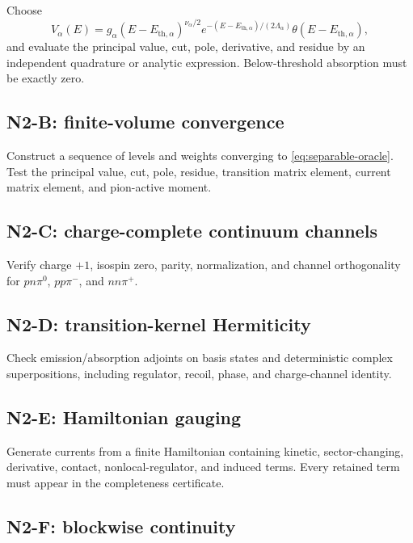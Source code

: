 \documentclass[11pt]{article}
\begin{document}
Choose
\begin{equation}
 V_\alpha(E)=g_\alpha
 (E-E_{\mathrm{th},\alpha})^{\nu_\alpha/2}
 e^{-(E-E_{\mathrm{th},\alpha})/(2\Lambda_\alpha)}
 \theta(E-E_{\mathrm{th},\alpha}),
 \label{eq:separable-oracle}
\end{equation}
and evaluate the principal value, cut, pole, derivative, and residue by an
independent quadrature or analytic expression.  Below-threshold absorption
must be exactly zero.

\subsection{N2-B: finite-volume convergence}

Construct a sequence of levels and weights converging to
\cref{eq:separable-oracle}.  Test the principal value, cut, pole, residue,
transition matrix element, current matrix element, and pion-active moment.

\subsection{N2-C: charge-complete continuum channels}

Verify charge \(+1\), isospin zero, parity, normalization, and channel
orthogonality for \(pn\pi^0\), \(pp\pi^-\), and \(nn\pi^+\).

\subsection{N2-D: transition-kernel Hermiticity}

Check emission/absorption adjoints on basis states and deterministic complex
superpositions, including regulator, recoil, phase, and charge-channel
identity.

\subsection{N2-E: Hamiltonian gauging}

Generate currents from a finite Hamiltonian containing kinetic,
sector-changing, derivative, contact, nonlocal-regulator, and induced terms.
Every retained term must appear in the completeness certificate.

\subsection{N2-F: blockwise continuity}
\end{document}

